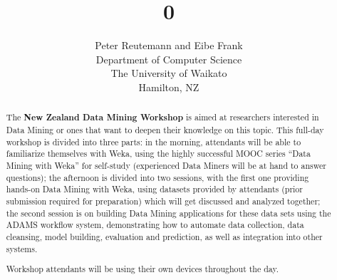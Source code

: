 \documentclass[a4paper,10pt]{article}
\title{0}
\author{Peter Reutemann and Eibe Frank \\ Department of Computer Science \\ The University of Waikato \\ Hamilton, NZ}
\begin{document}
\maketitle

\begin{abstract}
The \textbf{New Zealand Data Mining Workshop} is aimed at researchers interested in Data Mining or ones that want to deepen their knowledge on this topic. This full-day workshop is divided into three parts: in the morning, attendants will be able to familiarize themselves with Weka, using the highly successful MOOC series ``Data Mining with Weka'' for self-study (experienced Data Miners will be at hand to answer questions); the afternoon is divided into two sessions, with the first one providing hands-on Data Mining with Weka, using datasets provided by attendants (prior submission required for preparation) which will get discussed and analyzed together; the second session is on building Data Mining applications for these data sets using the ADAMS workflow system, demonstrating how to automate data collection, data cleansing, model building, evaluation and prediction, as well as integration into other systems.

Workshop attendants will be using their own devices throughout the day.
\end{abstract}
\end{document}
